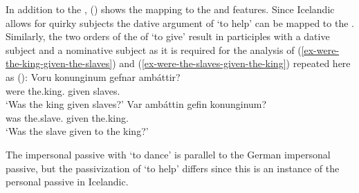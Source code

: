 \ea\label{da-repr-hm-Icelandic-two}
\z
In addition to the \argstl, () shows the mapping to the \spr and \comps features. Since
Icelandic allows for quirky subjects the dative argument of `to help' can be mapped to the
\sprl \citep[--148]{Wechsler95a-u}. Similarly, the two orders of the \argst of `to give' result in participles with a dative
subject and a nominative subject as it is required for the analysis of (\ref{ex-were-the-king-given-the-slaves}) and (\ref{ex-were-the-slaves-given-the-king}) repeated
here as ():
\eal
\ex\label{ex-were-the-king-given-the-slaves-two}
\gll Voru konunginum gefnar ambáttir?\\
     were the.king.\DAT{} given slaves.\NOM{}\\
\glt `Was the king given slaves?'
\ex\label{ex-were-the-slaves-given-the-king-two}
\gll Var ambáttin gefin konunginum?\\
     was the.slave.\NOM{} given the.king.\DAT\\
\glt `Was the slave given to the king?'
\zl

\noindent
The impersonal passive with `to dance' is parallel to the German impersonal passive, but the
passivization of `to help' differs since this is an instance of the personal passive in Icelandic.



